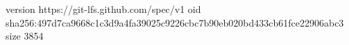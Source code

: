 version https://git-lfs.github.com/spec/v1
oid sha256:497d7ca9668c1c3d9a4fa39025c9226cbc7b90eb020bd433cb61fce22906abc3
size 3854
